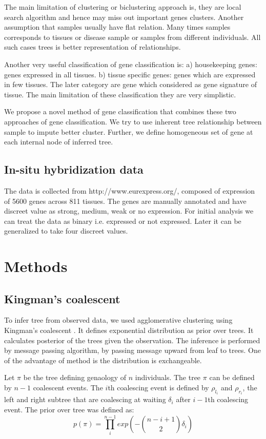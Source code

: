 \documentclass{article}
\begin{document}
The main limitation of clustering or biclustering approach is, they are local search algorithm
and hence may miss out important genes clusters. Another assumption that samples usually 
have flat relation. Many times samples corresponds to tissues or disease sample or samples 
from different individuals. All such cases trees is better representation of relationships.


Another very useful classification of gene classification is: a) housekeeping genes: genes
expressed in all tissues. b) tissue specific genes: genes which are expressed in few tissues.
The later category are gene which considered as gene signature of tissue. The main limitation
of these classification they are very simplistic. 

We propose a novel method of gene classification that combines these two approaches of 
gene classification. We try to use inherent tree relationship between sample to impute
better cluster. Further, we define homogeneous set of gene at each internal node of inferred
tree.


\subsection{In-situ hybridization data}

The data is collected from http://www.eurexpress.org/, composed of expression of 5600 genes across 811 tissues. The genes are manually annotated and have discreet value as strong, medium, weak or no expression. 
For initial analysis we can treat the data as binary i.e. expressed or not expressed. Later it can be generalized to take four discreet values. 


\section{Methods}

\subsection{Kingman's coalescent}
To infer tree from observed data, we used agglomerative clustering using Kingman's coalescent \cite{teh2008bayesian}.
It defines exponential distribution as prior over trees.  It calculates posterior of the trees given the observation.
The inference is performed by message passing algorithm, by passing message upward from leaf to trees. One of the advantage of
method is the distribution is exchangeable.

Let $\pi$ be the tree defining genaology of $n$ individuals. The tree $\pi$ can be defined by $n-1$ coalescent events. 
The $i$th coalescing event is defined by $\rho_{l_i}$ and $\rho_{r_i}$, the left and right subtree that are coalescing  
at waiting $\delta_i$ after $i-1$th coalescing event. The prior over tree was defined as:
\begin{equation}
	p(\pi) = \prod_{i}^{n-1}exp\left( -\binom{n-i +1}{2}\delta_i \right)
	\label{ref:prior}
\end{equation}
\end{document}
